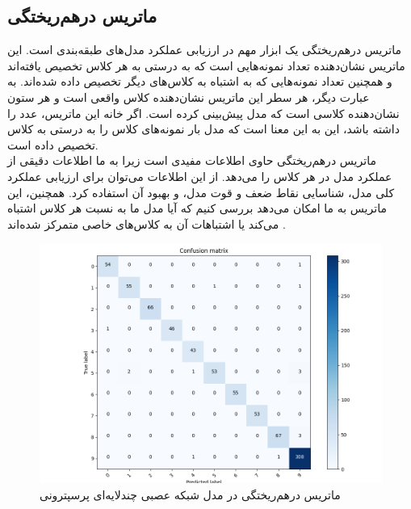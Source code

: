 \subsection[ماتریس درهم‌ریختگی]{ماتریس درهم‌ریختگی\protect{}}
ماتریس درهم‌ریختگی یک ابزار مهم در ارزیابی عملکرد مدل‌های طبقه‌بندی است. این ماتریس نشان‌دهنده تعداد نمونه‌هایی است که به درستی به هر کلاس تخصیص یافته‌اند و همچنین تعداد نمونه‌هایی که به اشتباه به کلاس‌های دیگر تخصیص داده شده‌اند. به عبارت دیگر، هر سطر این ماتریس نشان‌دهنده کلاس واقعی است و هر ستون نشان‌دهنده کلاسی است که مدل پیش‌بینی کرده است. اگر خانه  این ماتریس، عدد  را داشته باشد، این به این معنا است که مدل  بار نمونه‌های کلاس  را به درستی به کلاس  تخصیص داده است.
\\
ماتریس درهم‌ریختگی حاوی اطلاعات مفیدی است زیرا به ما اطلاعات دقیقی از عملکرد مدل در هر کلاس را می‌دهد. از این اطلاعات می‌توان برای ارزیابی عملکرد کلی مدل، شناسایی نقاط ضعف و قوت مدل، و بهبود آن استفاده کرد. همچنین، این ماتریس به ما امکان می‌دهد بررسی کنیم که آیا مدل ما به نسبت هر کلاس اشتباه می‌کند یا اشتباهات آن به کلاس‌های خاصی متمرکز شده‌اند \cite{Confusio72:online}.

\begin{figure}[h]
    \centering
    \includegraphics[width=1\textwidth]{confusion_mlp.png}
    \caption{ ماتریس درهم‌ریختگی در مدل شبکه عصبی چندلایه‌ای پرسپترونی}
\end{figure}


